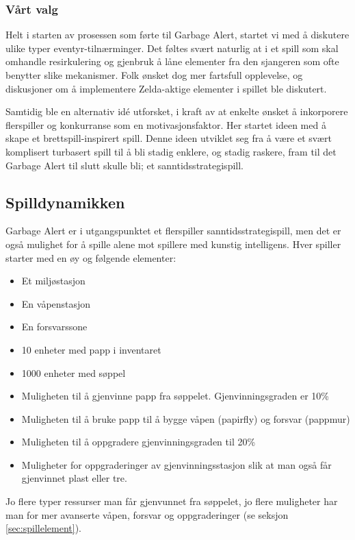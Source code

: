 \subsubsection{Vårt valg}
Helt i starten av prosessen som førte til Garbage Alert, startet vi med å diskutere ulike typer eventyr-tilnærminger. Det føltes svært naturlig at i et spill som skal omhandle resirkulering og gjenbruk å låne elementer fra den sjangeren som ofte benytter slike mekanismer. Folk ønsket dog mer fartsfull opplevelse, og diskusjoner om å implementere Zelda-aktige elementer i spillet ble diskutert.

Samtidig ble en alternativ idé utforsket, i kraft av at enkelte ønsket å inkorporere flerspiller og konkurranse som en motivasjonsfaktor. Her startet ideen med å skape et brettspill-inspirert spill. Denne ideen utviklet seg fra å være et svært komplisert turbasert spill til å bli stadig enklere, og stadig raskere, fram til det Garbage Alert til slutt skulle bli; et sanntidsstrategispill.



\subsection{Spilldynamikken}
Garbage Alert er i utgangspunktet et flerspiller sanntidsstrategispill,
men det er også mulighet for å spille alene mot spillere med kunstig
intelligens. Hver spiller starter med en øy og følgende elementer:
\begin{itemize}
	\item Et miljøstasjon
	\item En våpenstasjon
	\item En forsvarssone
	\item 10 enheter med papp i inventaret
	\item 1000 enheter med søppel
	\item Muligheten til å gjenvinne papp fra søppelet. Gjenvinningsgraden er 10\%
	\item Muligheten til å bruke papp til å bygge våpen (papirfly) og forsvar (pappmur)
	\item Muligheten til å oppgradere gjenvinningsgraden til 20\%
	\item Muligheter for oppgraderinger av gjenvinningsstasjon slik at man også får gjenvinnet plast eller tre.
\end{itemize}

Jo flere typer ressurser man får gjenvunnet fra søppelet, jo flere muligheter har man for mer avanserte våpen, forsvar og oppgraderinger (se seksjon \ref{sec:spillelement}).

